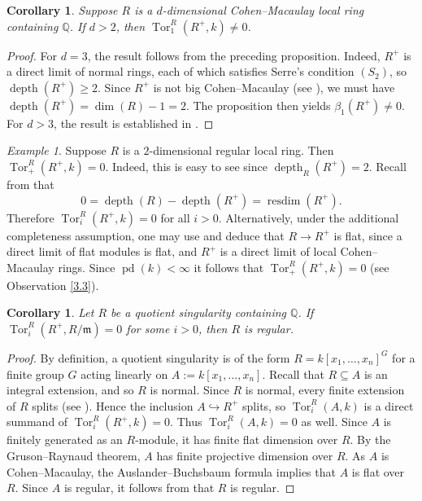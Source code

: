 \documentclass[11pt,a4paper]{amsart}
\numberwithin{equation}{section}
\newtheorem{corollary}[theorem]{Corollary}
\theoremstyle{definition}
\theoremstyle{remark}
\newtheorem{example}[theorem]{Example}
\newcommand{\pd}{\operatorname{pd}}
\newcommand{\Tor}{\operatorname{Tor}}
\newcommand{\depth}{\operatorname{depth}}
\begin{document}
\begin{corollary}
Suppose \(R\) is a \(d\)-dimensional Cohen--Macaulay local ring containing \(\mathbb{Q}\). If \(d>2\), then \(\Tor_1^R(R^+,k)\neq 0\).
	\end{corollary}
	
\begin{proof}
For \(d=3\), the result follows from the preceding proposition. Indeed, \(R^+\) is a direct limit of normal rings, each of which satisfies Serre's condition \((S_2)\), so \(\depth(R^+)\ge 2\). Since \(R^+\) is not big Cohen--Macaulay  (see \cite[Ex. 7.2]{h}), we must have \(\depth(R^+)=\dim(R)-1=2\). The proposition then yields \(\beta_1(R^+)\neq 0\). For \(d>3\), the result is established in \cite{p}.
\end{proof}

\begin{example}
	Suppose \(R\) is a \(2\)-dimensional regular local ring. Then \(\operatorname{Tor}_+^R(R^+, k) = 0\). Indeed, this is easy to see since \(\depth_R(R^+) = 2\). Recall from \cite[4.1]{BS} that
	\[
	0 = \depth(R) - \depth(R^+) = \operatorname{resdim}(R^+).
	\]
	Therefore \(\operatorname{Tor}_i^R(R^+, k) = 0\) for all \(i > 0\). Alternatively, under the additional completeness assumption, one may use \cite[23.1]{mat} and deduce that \(R \to R^+\) is flat, since a direct limit of flat modules is flat, and \(R^+\) is a direct limit of local Cohen--Macaulay rings. Since $\pd(k)<\infty$ it follows that \(\operatorname{Tor}_+^R(R^+, k) = 0\) (see {Observation} \ref{3.3}). 
\end{example}
	
	
\begin{corollary}\label{qu}
	Let \(R\) be a quotient singularity containing \(\mathbb{Q}\). If
	\(
	\operatorname{Tor}_i^R(R^+, R/\mathfrak{m}) = 0
	\)
	for some \(i > 0\), then \(R\) is regular.
\end{corollary}

\begin{proof}
	By definition, a quotient singularity is of the form \(R = k[x_1, \dots, x_n]^G\) for a finite group \(G\) acting linearly on \(A := k[x_1, \dots, x_n]\). Recall that \(R \subseteq A\) is an integral extension, and so \(R\) is normal. Since \(R\) is normal, every finite extension of \(R\) splits (see \cite[Lemma 2.1]{p}). Hence the inclusion \(A \hookrightarrow R^+\) splits, so \(\operatorname{Tor}_i^R(A, k)\) is a direct summand of \(\operatorname{Tor}_i^R(R^+, k) = 0\). Thus \(\operatorname{Tor}_i^R(A, k) = 0\) as well.
Since \(A\) is finitely generated as an \(R\)-module, it has finite flat dimension over \(R\). By the Gruson--Raynaud theorem, \(A\) has finite projective dimension over \(R\). As \(A\) is Cohen--Macaulay, the Auslander--Buchsbaum formula implies that \(A\) is flat over \(R\). Since \(A\) is regular, it follows from \cite[2.2.12(a)]{BH} that \(R\) is regular.
\end{proof}
\end{document}
